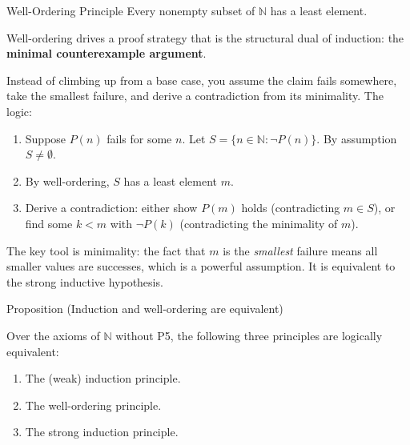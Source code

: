 \noindent\begin{propositionbox}{Well-Ordering Principle}
Every nonempty subset of $\mathbb{N}$ has a least element.
\end{propositionbox}
\label{sec:wellordering}

\begin{remark}
Well-ordering drives a proof strategy that is the structural dual of
induction: the \textbf{minimal counterexample argument}.

Instead of climbing up from a base case, you assume the claim fails
somewhere, take the smallest failure, and derive a contradiction from
its minimality. The logic:

\begin{enumerate}[itemsep=2pt]
  \item Suppose $P(n)$ fails for some $n$. Let
    $S = \{n \in \mathbb{N} : \neg P(n)\}$. By assumption $S \neq \emptyset$.
  \item By well-ordering, $S$ has a least element $m$.
  \item Derive a contradiction: either show $P(m)$ holds (contradicting
    $m \in S$), or find some $k < m$ with $\neg P(k)$ (contradicting
    the minimality of $m$).
\end{enumerate}

The key tool is minimality: the fact that $m$ is the \emph{smallest}
failure means all smaller values are successes, which is a powerful
assumption. It is equivalent to the strong inductive hypothesis.
\end{remark}

\begin{propositionbox}{Proposition (Induction and well-ordering are equivalent)}
\begin{proposition}
\label{prop:induction-well-ordering-equivalent}
Over the axioms of $\mathbb{N}$ without P5, the following three
principles are logically equivalent:
\begin{enumerate}[itemsep=2pt]
  \item The (weak) induction principle.
  \item The well-ordering principle.
  \item The strong induction principle.
\end{enumerate}
\end{proposition}
\end{propositionbox}

